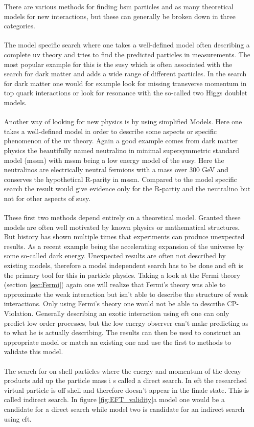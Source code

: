 \documentclass[../Bachelorarbeit.tex]{subfiles}
\begin{document}
There are various methods for finding \acrshort{bsm} particles and as many theoretical models for new interactions, but these can generally be broken down in three categories.
\\\\
The model specific search where one takes a well-defined model often describing a complete \acrshort{uv} theory and tries to find the predicted particles in measurements.
The most popular example for this is the \acrfull{susy}\cite{Murayama.2000} which is often associated with the search for dark matter and adds a wide range of different particles.
In the search for dark matter one would for example look for missing transverse momentum in top quark interactions or look for resonance with the so-called
two Higgs doublet models.
\\\\
Another way of looking for new physics is by using simplified Models. Here one takes a well-defined model in order to describe some aspects or specific phenomenon of the \acrshort{uv} theory.
Again a good example comes from dark matter physics the beautifully named neutralino in minimal supersymmetric standard model (\acrshort{mssm})\cite{Ellis.} with \acrshort{mssm} being a low energy model of the \acrshort{susy}.
Here the neutralinos are electrically neutral fermions with a mass over 300 GeV and conserves the hypothetical R-parity in \acrshort{mssm}. Compared to the model specific search the result
would give evidence only for the R-partiy and the neutralino but not for other aspects of \acrshort{susy}.
\\\\
These first two methods depend entirely on a theoretical model. Granted these models are often well motivated by known physics or mathematical structures.
But history has shown multiple times that experiments can produce unexpected results. As a recent example being the accelerating expansion of the universe by some so-called dark energy.
Unexpected results are often not described by existing models, therefore a model independent search has to be done and \acrshort{eft} is the primary tool for this in particle physics.
Taking a look at the Fermi theory (section \ref{sec:Fermi}) again one will realize that Fermi's theory was able to approximate the weak interaction but isn't able to describe the
structure of weak interactions. Only using Fermi's theory one would not be able to describe CP-Violation. Generally describing an exotic interaction using \acrshort{eft} one can only predict low order
processes, but the low energy observer can't make predicting as to what he is actually describing. The results can then be used to construct an appropriate model or match an existing one and
use the first to methods to validate this model.
\\\\
The search for on shell particles where the energy and momentum of the decay products add up the particle mass i s called a direct search. In \acrshort{eft} the researched virtual particle is off shell and therefore doesn't appear in the finale state. This is called indirect search.
In figure \ref{fig:EFT_validity}a model one would be a candidate for a direct search while model two is candidate for an indirect search using \acrshort{eft}.
\end{document}
